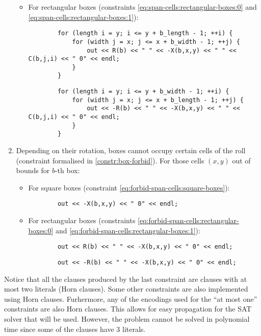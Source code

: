 \begin{enumerate}
\begin{itemize}
		\item For rectangular boxes (constraints \ref{eq:span-cells:rectangular-boxes:0} and
		\ref{eq:span-cells:rectangular-boxes:1}):
		{\NOINDENT \begin{lstlisting}
		for (length i = y; i <= y + b_length - 1; ++i) {
			for (width j = x; j <= x + b_width - 1; ++j) {
				out << R(b) << " " << -X(b,x,y) << " " << C(b,j,i) << " 0" << endl;
			}
		}
		\end{lstlisting}}
		{\NOINDENT \begin{lstlisting}
		for (length i = y; i <= y + b_width - 1; ++i) {
			for (width j = x; j <= x + b_length - 1; ++j) {
				out << -R(b) << " " << -X(b,x,y) << " " << C(b,j,i) << " 0" << endl;
			}
		}
		\end{lstlisting}}
	\end{itemize}
    
	\item Depending on their rotation, boxes cannot occupy certain cells of the
	roll (constraint formalised in \ref{constr:box-forbid}). For those cells $(x,y)$
	out of bounds for $b$-th box:
    
	\begin{itemize}
		\item For square boxes (constraint \ref{eq:forbid-span-cells:square-boxes}):
		{\NOINDENT \begin{lstlisting}
		out << -X(b,x,y) << " 0" << endl;
		\end{lstlisting}}
		
		\item For rectangular boxes (constraints \ref{eq:forbid-span-cells:rectangular-boxes:0}
		and \ref{eq:forbid-span-cells:rectangular-boxes:1}):
		{\NOINDENT \begin{lstlisting}
		out << R(b) << " " << -X(b,x,y) << " 0" << endl;
		\end{lstlisting}}
		{\NOINDENT \begin{lstlisting}
		out << -R(b) << " " << -X(b,x,y) << " 0" << endl;
		\end{lstlisting}}
	\end{itemize}
    
\end{enumerate}

Notice that all the clauses produced by the last constraint are clauses with at most
two literals (Horn clauses). Some other constraints are also implemented using Horn clauses.
Furhermore, any of the encodings used for the ``at most one'' constraints are also Horn
clauses. This allows for easy propagation for the SAT solver that will be used. However,
the problem cannot be solved in polynomial time since some of the clauses have 3 literals.

